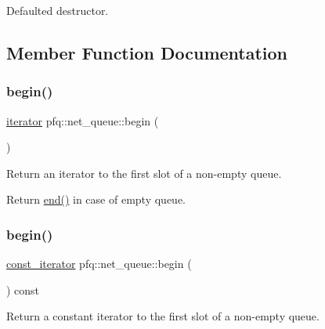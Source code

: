 Defaulted destructor. 



\subsection{Member Function Documentation}
\mbox{\label{classpfq_1_1net__queue_a36d91779a4ac2a6e3f7e63ff8594ada7}} 
\subsubsection{\texorpdfstring{begin()}{begin()}\hspace{0.1cm}{\footnotesize\ttfamily [1/2]}}
{\footnotesize\ttfamily \hyperlink{structpfq_1_1net__queue_1_1iterator}{iterator} pfq\+::net\+\_\+queue\+::begin (\begin{DoxyParamCaption}{ }\end{DoxyParamCaption})\hspace{0.3cm}{\ttfamily [inline]}}



Return an iterator to the first slot of a non-\/empty queue. 

Return \hyperlink{classpfq_1_1net__queue_acef930aef921f06803621af79f993b25}{end()} in case of empty queue. \mbox{\label{classpfq_1_1net__queue_a8e2a7861bfcb61f48d902acbdc4fa411}} 
\subsubsection{\texorpdfstring{begin()}{begin()}\hspace{0.1cm}{\footnotesize\ttfamily [2/2]}}
{\footnotesize\ttfamily \hyperlink{structpfq_1_1net__queue_1_1const__iterator}{const\+\_\+iterator} pfq\+::net\+\_\+queue\+::begin (\begin{DoxyParamCaption}{ }\end{DoxyParamCaption}) const\hspace{0.3cm}{\ttfamily [inline]}}



Return a constant iterator to the first slot of a non-\/empty queue. 

